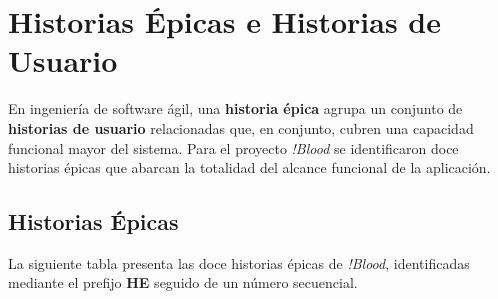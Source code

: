 \section{Historias Épicas e Historias de Usuario}

En ingeniería de software ágil, una \textbf{historia épica} agrupa un conjunto de
\textbf{historias de usuario} relacionadas que, en conjunto, cubren una capacidad funcional
mayor del sistema. Para el proyecto \textit{!Blood} se identificaron doce historias épicas
que abarcan la totalidad del alcance funcional de la aplicación.

\subsection{Historias Épicas}

La siguiente tabla presenta las doce historias épicas de \textit{!Blood},
identificadas mediante el prefijo \textbf{HE} seguido de un número secuencial.

\vspace{0.5em}

